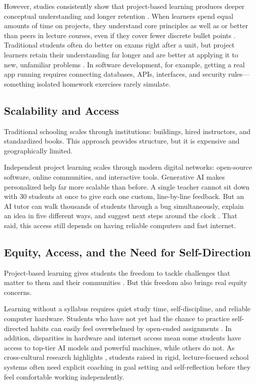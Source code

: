 \documentclass[11pt]{article}
\begin{document}
However, studies consistently show that project-based learning produces deeper conceptual understanding and longer retention \citep{blumenfeld1991,barron1998}. When learners spend equal amounts of time on projects, they understand core principles as well as or better than peers in lecture courses, even if they cover fewer discrete bullet points \citep{barron1998}. Traditional students often do better on exams right after a unit, but project learners retain their understanding far longer and are better at applying it to new, unfamiliar problems \citep{barron1998,kumar2024}. In software development, for example, getting a real app running requires connecting databases, APIs, interfaces, and security rules---something isolated homework exercises rarely simulate.

\subsection{Scalability and Access}
Traditional schooling scales through institutions: buildings, hired instructors, and standardized books. This approach provides structure, but it is expensive and geographically limited. 

Independent project learning scales through modern digital networks: open-source software, online communities, and interactive tools. Generative AI makes personalized help far more scalable than before. A single teacher cannot sit down with 30 students at once to give each one custom, line-by-line feedback. But an AI tutor can walk thousands of students through a bug simultaneously, explain an idea in five different ways, and suggest next steps around the clock \citep{kumar2024,ravi2025,vanlehn2005}. That said, this access still depends on having reliable computers and fast internet.

\subsection{Equity, Access, and the Need for Self-Direction}
Project-based learning gives students the freedom to tackle challenges that matter to them and their communities \citep{farmer2019}. But this freedom also brings real equity concerns.

Learning without a syllabus requires quiet study time, self-discipline, and reliable computer hardware. Students who have not yet had the chance to practice self-directed habits can easily feel overwhelmed by open-ended assignments \citep{hmelo2004,zimmerman2002}. In addition, disparities in hardware and internet access mean some students have access to top-tier AI models and powerful machines, while others do not. As cross-cultural research highlights \citep{guglielmino2011,frambach2012}, students raised in rigid, lecture-focused school systems often need explicit coaching in goal setting and self-reflection before they feel comfortable working independently.
\end{document}
